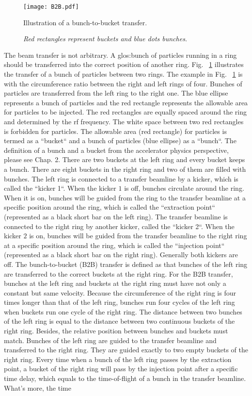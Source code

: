\begin{figure}[H]
   \centering   
   \texttt{[image: B2B.pdf]}
   \caption{Illustration of a bunch-to-bucket transfer.}
	\caption*{\textsl{\small{Red rectangles represent buckets and blue dots bunches.}}}

   \label{B2B}
\end{figure}

The beam transfer is not arbitrary. A \gls{glos:bunch} of particles running in a ring should be transferred into the correct position of another ring. Fig. ~\ref{B2B} illustrates the transfer of a bunch of particles between two rings. The example in Fig. ~\ref{B2B} is with the circumference ratio between the right and left rings of four. Bunches of particles are transferred from the left ring to the right one. The blue ellipse represents a bunch of particles and the red rectangle represents the allowable area for particles to be injected. The red rectangles are equally spaced around the ring and determined by the rf frequency. The white space between two red rectangles is forbidden for particles. The allowable area (red rectangle) for particles is termed as a ``bucket`` and a bunch of particles (blue ellipse) as a ``bunch``. The definition of a bunch and a bucket from the accelerator physics perspective, please see Chap. 2. There are two buckets at the left ring and every bucket keeps a bunch. There are eight buckets in the right ring and two of them are filled with bunches. The left ring is connected to a transfer beamline by a kicker, which is called the ``kicker 1``. When the kicker $1$ is off, bunches circulate around the ring. When it is on, bunches will be guided from the ring to the transfer beamline at a specific position around the ring, which is called the ``extraction point`` (represented as a black short bar on the left ring). The transfer beamline is connected to the right ring by another kicker, called the ``kicker 2``. When the kicker $2$ is on, bunches will be guided from the transfer beamline to the right ring at a specific position around the ring, which is called the ``injection point`` (represented as a black short bar on the right ring). Generally both kickers are off. The bunch-to-bucket (B2B) transfer is defined as that bunches of the left ring are transferred to the correct buckets at the right ring. For the B2B transfer, bunches at the left ring and buckets at the right ring must have not only a constant but same velocity. Because the circumference of the right ring is four times longer than that of the left ring, bunches run four cycles of the left ring when buckets run one cycle of the right ring. The distance between two bunches of the left ring is equal to the distance between two continuous buckets of the right ring. Besides, the relative position between bunches and buckets must match. Bunches of the left ring are guided to the transfer beamline and transferred to the right ring. They are guided exactly to two empty buckets of the right ring. Every time when a bunch of the left ring passes by the extraction point, a bucket of the right ring will pass by the injection point after a specific time delay, which equals to the time-of-flight of a bunch in the transfer beamline. What's more, the time 